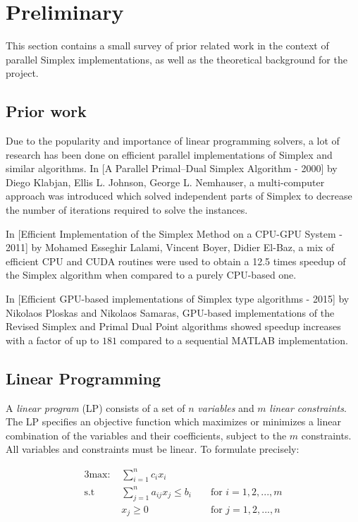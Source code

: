 \section{Preliminary}

This section contains a small survey of prior related work in the context of parallel Simplex implementations, as well as the theoretical background for the project.

\subsection{Prior work}\label{priorwork}
Due to the popularity and importance of linear programming solvers, a lot of research has been done on efficient parallel implementations of Simplex and similar algorithms. In [A Parallel Primal–Dual Simplex Algorithm - 2000] by Diego Klabjan, Ellis L. Johnson, George L. Nemhauser, a multi-computer approach was introduced which solved independent parts of Simplex to decrease the number of iterations required to solve the instances.

In [Efficient Implementation of the Simplex Method on a CPU-GPU System - 2011] by Mohamed Esseghir Lalami, Vincent Boyer, Didier El-Baz, a mix of efficient CPU and CUDA routines were used to obtain a 12.5 times speedup of the Simplex algorithm when compared to a purely CPU-based one.

In [Efficient GPU-based implementations of Simplex type algorithms - 2015] by Nikolaos Ploskas and Nikolaos Samaras, GPU-based implementations of the Revised Simplex and Primal Dual Point algorithms showed speedup increases with a factor of up to $181$ compared to a sequential MATLAB implementation.

\subsection{Linear Programming}
A \textit{linear program} (LP) consists of a set of $n$ \textit{variables} and $m$ \textit{linear constraints}. The LP specifies an objective function which maximizes or minimizes a linear combination of the variables and their coefficients, subject to the $m$ constraints. All variables and constraints must be linear. To formulate precisely:

\begin{alignat*}{3}
\text{max: } &\sum_{i=1}^{n} c_i x_i\\
\text{s.t }  & \sum_{j=1}^{n} a_{ij} x_j \leq b_i && \text{ for } i=1,2,...,m\\
& x_j \geq 0                         && \text{ for } j=1,2,...,n
\end{alignat*}

